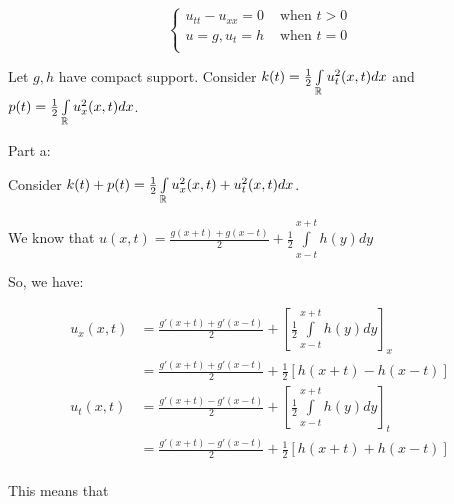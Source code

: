 \documentclass[a4paper,12pt]{article}
\begin{document}
\begin{displaymath}
   \left\{
     \begin{array}{lr}
       u_{tt} - u_{xx} = 0  & \text{ when } t>0 \\
       u=g, u_t = h & \text{ when } t=0 \\
     \end{array}
   \right.
\end{displaymath}

Let $g,h$ have compact support. Consider $k(t) = \frac{1}{2} \int\limits_{\mathbb{R}} u_t^2(x,t) dx$ and $p(t) = \frac{1}{2} \int\limits_{\mathbb{R}} u_x^2(x,t) dx$.

Part a:

Consider $k(t) + p(t) = \frac{1}{2}\int\limits_{\mathbb{R}} u_x^2(x,t) + u_t^2(x,t) dx$.

We know that $u(x,t) = \frac{g(x+t)+g(x-t)}{2} + \frac{1}{2}\int\limits_{x-t}^{x+t} h(y)dy$

So, we have:

\begin{align*}
u_x(x,t) &= \frac{g'(x+t)+g'(x-t)}{2} + \left[\frac{1}{2}\int\limits_{x-t}^{x+t} h(y)dy\right]_x\\
&= \frac{g'(x+t)+g'(x-t)}{2} + \frac{1}{2}\left[h(x+t) - h(x-t)\right]\\
u_t(x,t) &= \frac{g'(x+t)-g'(x-t)}{2} + \left[\frac{1}{2}\int\limits_{x-t}^{x+t} h(y)dy\right]_t\\
&= \frac{g'(x+t)-g'(x-t)}{2} + \frac{1}{2}\left[h(x+t) + h(x-t)\right]\\
\end{align*}

This means that
\end{document}
